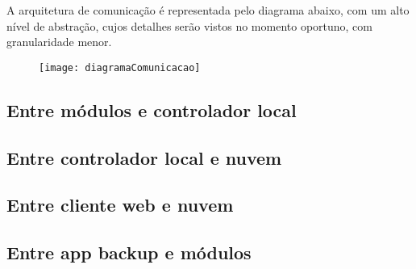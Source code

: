 A arquitetura de comunicação é representada pelo diagrama abaixo, com um alto nível de abstração, cujos detalhes serão vistos no momento oportuno, com granularidade menor.


\begin{figure}[H]
	\centering
	\caption{}
  \texttt{[image: diagramaComunicacao]}
\label{fig:diagramaComunicacao}
\end{figure}

\subsection{Entre módulos e controlador local}
\subsection{Entre controlador local e nuvem}
\subsection{Entre cliente web e nuvem}
\subsection{Entre app backup e módulos}
